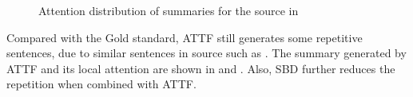 \begin{figure}[th!]
\centering
{}
\quad
{}
\quad
{}
\quad
{}
\quad
{}
\quad
{}
\quad
{}
\caption{Attention distribution of summaries for the source in }
\label{fig:attn_maps}
\end{figure}

Compared with the Gold standard,
ATTF still generates some repetitive sentences,
due to similar sentences in source
such as .
The summary generated by ATTF and its local attention are
shown in  and .
Also, SBD further reduces the repetition when combined with ATTF. 

